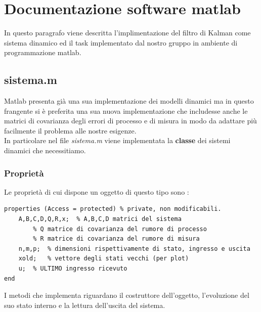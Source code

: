 \section{Documentazione software matlab}
In questo paragrafo viene descritta l'implimentazione del filtro di Kalman come sistema dinamico ed il task implementato dal nostro gruppo in ambiente di programmazione matlab.
\subsection{sistema.m}
Matlab presenta già una sua implementazione dei modelli dinamici ma in questo frangente si è preferita una sua nuova implementazione che includesse anche le matrici di covarianza degli errori di processo e di misura in modo da adattare più facilmente il problema alle nostre esigenze.\\
In particolare nel file \textit{sistema.m} viene implementata la \textbf{classe} dei sistemi dinamici che necessitiamo.\\
\subsubsection{Proprietà}
Le proprietà di cui dispone un oggetto di questo tipo sono :
\begin{lstlisting}[frame=single]
properties (Access = protected) % private, non modificabili.
	A,B,C,D,Q,R,x;	% A,B,C,D matrici del sistema
		% Q matrice di covarianza del rumore di processo
		% R matrice di covarianza del rumore di misura
	n,m,p;	% dimensioni rispettivamente di stato, ingresso e uscita
	xold;	% vettore degli stati vecchi (per plot)
	u;	% ULTIMO ingresso ricevuto
end
\end{lstlisting}

I metodi che implementa riguardano il costruttore dell'oggetto, l'evoluzione del suo stato interno e la lettura dell'uscita del sistema.\\
\newpage
